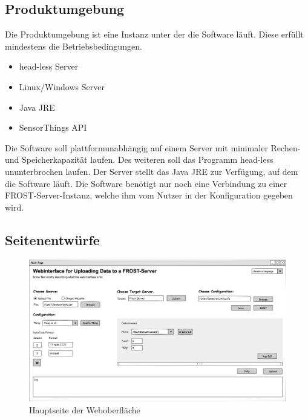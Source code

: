 \documentclass[12 pt]{article}
\begin{document}
\subsection{Produktumgebung}
Die Produktumgebung ist eine Instanz unter der die Software läuft. Diese erfüllt mindestens die Betriebsbedingungen.
\begin{itemize}
\item head-less Server
\item Linux/Windows Server
\item Java JRE
\item SensorThings API
\end{itemize}
Die Software soll plattformunabhängig auf einem Server mit minimaler Rechen- und Speicherkapazität laufen. Des weiteren soll das Programm head-less ununterbrochen laufen. Der Server stellt das Java JRE zur Verfügung, auf dem die Software läuft. Die Software benötigt nur noch eine Verbindung zu einer FROST-Server-Instanz, welche ihm vom Nutzer in der Konfiguration gegeben wird.

\subsection{Seitenentwürfe}


\begin{figure}[ht]
\centering
\includegraphics[scale=0.4, angle=90]{images/gui}
\caption{\label{fig:guiMain}Hauptseite der Weboberfläche}
\end{figure}
\end{document}
